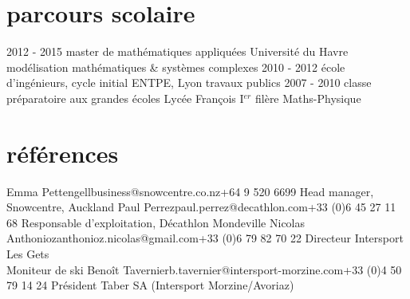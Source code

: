 \documentclass[]{farangoth-cv}
\begin{document}
\section{parcours scolaire}
\begin{entrylist}
  \entry%
  {2012 \-- 2015}
  {master de mathématiques appliquées}
  {Université du Havre}
  {%
    modélisation mathématiques \& systèmes complexes
  }
  \entry%
  {2010 \-- 2012}
  {école d'ingénieurs, cycle initial}
  {ENTPE, Lyon}
  {%
    travaux publics
  }
  \entry%
  {2007 \-- 2010}
  {classe préparatoire aux grandes écoles}
  {Lycée François I$^{er}$}
  {%
    filère Maths\--Physique
  }
\end{entrylist}

\section{références}
\begin{entrylist}
  \doubleentryref%
  {Emma Pettengell}{business@snowcentre.co.nz}{+64 9 520 6699}
  {%
    Head manager, Snowcentre, Auckland 
  }
  {Paul Perrez}{paul.perrez@decathlon.com}{+33 (0)6 45 27 11 68}
  {%
    Responsable d'exploitation, Décathlon Mondeville
  }
  \doubleentryref%
  {Nicolas Anthonioz}{anthonioz.nicolas@gmail.com}{+33 (0)6 79 82 70 22}
  {%
    Directeur Intersport Les Gets\\
    Moniteur de ski
  }
  {Benoît Tavernier}{b.tavernier@intersport-morzine.com}{+33 (0)4 50 79 14 24}
  {%
    Président Taber SA (Intersport Morzine/Avoriaz) 
  }
\end{entrylist}
\end{document}
